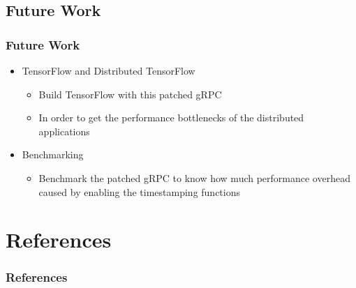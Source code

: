 \documentclass[10pt]{beamer}
\begin{document}
\subsection{Future Work}
\begin{frame}
\frametitle{Future Work}
\begin{itemize}
\item TensorFlow and Distributed TensorFlow
    \begin{itemize}
        \item Build TensorFlow with this patched gRPC
        \item In order to get the performance bottlenecks of the distributed
              applications
    \end{itemize}
\item Benchmarking
    \begin{itemize}
        \item Benchmark the patched gRPC to know how much performance overhead
              caused by enabling the timestamping functions
    \end{itemize}
\end{itemize}
\end{frame}


\section{References}


\begin{frame}
\frametitle{References}
{\footnotesize
    \setsansfont{Liberation Serif}
    
}
\end{frame}


%
%
%
\end{document}
